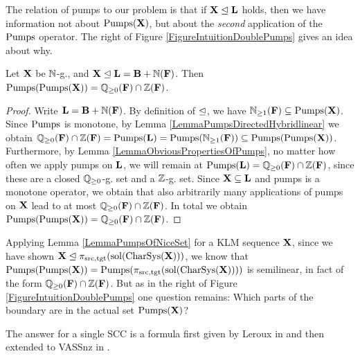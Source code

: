 The relation of pumps to our problem is that if \(\mathbf{X} \trianglelefteq \mathbf{L}\) holds, then we have information not about \(\operatorname{Pumps}(\mathbf{X})\), but about the \emph{second} application of the \(\operatorname{Pumps}\) operator. The right of Figure \ref{FigureIntuitionDoublePumps} gives an idea about why.

\begin{lemma} \label{LemmaPumpsOfNiceSet}
Let \(\mathbf{X}\) be \(\mathbb{N}\)-g., and \(\mathbf{X} \trianglelefteq \mathbf{L}=\mathbf{B}+\mathbb{N}(\mathbf{F})\). Then \(\operatorname{Pumps}(\operatorname{Pumps}(\mathbf{X}))=\mathbb{Q}_{\geq 0}(\mathbf{F}) \cap \mathbb{Z}(\mathbf{F})\).
\end{lemma}

\begin{proof}
Write \(\mathbf{L}=\mathbf{B}+\mathbb{N}(\mathbf{F})\). By definition of \(\trianglelefteq\), we have \(\mathbb{N}_{\geq 1}(\mathbf{F}) \subseteq \operatorname{Pumps}(\mathbf{X})\). Since \(\operatorname{Pumps}\) is monotone, by Lemma \ref{LemmaPumpsDirectedHybridlinear} we obtain \(\mathbb{Q}_{\geq 0}(\mathbf{F}) \cap \mathbb{Z}(\mathbf{F}) = \operatorname{Pumps}(\mathbf{L})=\operatorname{Pumps}(\mathbb{N}_{\geq 1}(\mathbf{F})) \subseteq \operatorname{Pumps}(\operatorname{Pumps}(\mathbf{X}))\). Furthermore, by Lemma \ref{LemmaObviousPropertiesOfPumps}, no matter how often we apply pumps on \(\mathbf{L}\), we will remain at \(\operatorname{Pumps}(\mathbf{L})=\mathbb{Q}_{\geq 0}(\mathbf{F}) \cap \mathbb{Z}(\mathbf{F})\), since these are a closed \(\mathbb{Q}_{\geq 0}\)-g. set and a \(\mathbb{Z}\)-g. set. Since \(\mathbf{X} \subseteq \mathbf{L}\) and pumps is a monotone operator, we obtain that also arbitrarily many applications of pumps on \(\mathbf{X}\) lead to at most \(\mathbb{Q}_{\geq 0}(\mathbf{F}) \cap \mathbb{Z}(\mathbf{F})\). In total we obtain \(\operatorname{Pumps}(\operatorname{Pumps}(\mathbf{X}))=\mathbb{Q}_{\geq 0}(\mathbf{F}) \cap \mathbb{Z}(\mathbf{F})\).
\end{proof}

Applying Lemma \ref{LemmaPumpsOfNiceSet} for a KLM sequence \(\mathbf{X}\), since we have shown \(\mathbf{X} \trianglelefteq \pi_{\text{src}, \text{tgt}}(\operatorname{sol}(\operatorname{CharSys}(\mathbf{X})))\), we know that \(\operatorname{Pumps}(\operatorname{Pumps}(\mathbf{X}))=\operatorname{Pumps}(\pi_{\text{src}, \text{tgt}}(\operatorname{sol}(\operatorname{CharSys}(\mathbf{X}))))\) is semilinear, in fact of the form \(\mathbb{Q}_{\geq 0}(\mathbf{F}) \cap \mathbb{Z}(\mathbf{F})\). But as in the right of Figure \ref{FigureIntuitionDoublePumps} one question remains: Which parts of the boundary are in the actual set \(\operatorname{Pumps}(\mathbf{X})\)?

The answer for a single SCC is a formula first given by Leroux in \cite{Leroux13} and then extended to VASSnz in \cite{Guttenberg24}. 

